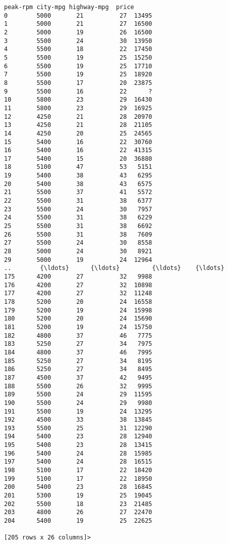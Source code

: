 \documentclass[11pt]{article}
\begin{document}
\begin{tcolorbox}[breakable, boxrule=.5pt, size=fbox, pad at break*=1mm, opacityfill=0]
\begin{Verbatim}[commandchars=\\\{\}]
     peak-rpm city-mpg highway-mpg  price
0        5000       21          27  13495
1        5000       21          27  16500
2        5000       19          26  16500
3        5500       24          30  13950
4        5500       18          22  17450
5        5500       19          25  15250
6        5500       19          25  17710
7        5500       19          25  18920
8        5500       17          20  23875
9        5500       16          22      ?
10       5800       23          29  16430
11       5800       23          29  16925
12       4250       21          28  20970
13       4250       21          28  21105
14       4250       20          25  24565
15       5400       16          22  30760
16       5400       16          22  41315
17       5400       15          20  36880
18       5100       47          53   5151
19       5400       38          43   6295
20       5400       38          43   6575
21       5500       37          41   5572
22       5500       31          38   6377
23       5500       24          30   7957
24       5500       31          38   6229
25       5500       31          38   6692
26       5500       31          38   7609
27       5500       24          30   8558
28       5000       24          30   8921
29       5000       19          24  12964
..        {\ldots}      {\ldots}         {\ldots}    {\ldots}
175      4200       27          32   9988
176      4200       27          32  10898
177      4200       27          32  11248
178      5200       20          24  16558
179      5200       19          24  15998
180      5200       20          24  15690
181      5200       19          24  15750
182      4800       37          46   7775
183      5250       27          34   7975
184      4800       37          46   7995
185      5250       27          34   8195
186      5250       27          34   8495
187      4500       37          42   9495
188      5500       26          32   9995
189      5500       24          29  11595
190      5500       24          29   9980
191      5500       19          24  13295
192      4500       33          38  13845
193      5500       25          31  12290
194      5400       23          28  12940
195      5400       23          28  13415
196      5400       24          28  15985
197      5400       24          28  16515
198      5100       17          22  18420
199      5100       17          22  18950
200      5400       23          28  16845
201      5300       19          25  19045
202      5500       18          23  21485
203      4800       26          27  22470
204      5400       19          25  22625

[205 rows x 26 columns]>
\end{Verbatim}
\end{tcolorbox}
        
\end{document}
